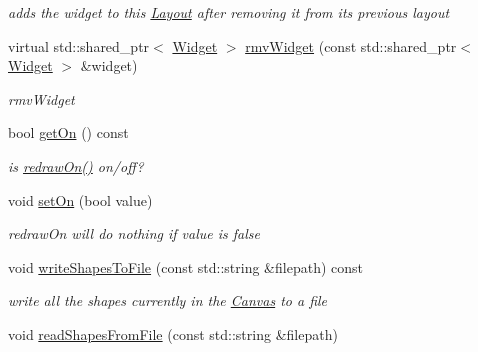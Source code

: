 \begin{DoxyCompactItemize}
\begin{DoxyCompactList}\small\item\em adds the widget to this \hyperlink{classcanvascv_1_1Layout}{Layout} after removing it from it\textquotesingle{}s previous layout \end{DoxyCompactList}\item 
virtual std\+::shared\+\_\+ptr$<$ \hyperlink{classcanvascv_1_1Widget}{Widget} $>$ \hyperlink{classcanvascv_1_1Canvas_a70248a9be2eedcacad74c9be5fd615eb}{rmv\+Widget} (const std\+::shared\+\_\+ptr$<$ \hyperlink{classcanvascv_1_1Widget}{Widget} $>$ \&widget)
\begin{DoxyCompactList}\small\item\em rmv\+Widget \end{DoxyCompactList}\item 
bool \hyperlink{classcanvascv_1_1Canvas_afe6a2955a5bbee8903350b4fba3f4473}{get\+On} () const \hypertarget{classcanvascv_1_1Canvas_afe6a2955a5bbee8903350b4fba3f4473}{}\label{classcanvascv_1_1Canvas_afe6a2955a5bbee8903350b4fba3f4473}

\begin{DoxyCompactList}\small\item\em is \hyperlink{classcanvascv_1_1Canvas_a018c66e277de7904b8146ea3f3feebdd}{redraw\+On()} on/off? \end{DoxyCompactList}\item 
void \hyperlink{classcanvascv_1_1Canvas_aba149ea25c6cdad2673133a060355954}{set\+On} (bool value)\hypertarget{classcanvascv_1_1Canvas_aba149ea25c6cdad2673133a060355954}{}\label{classcanvascv_1_1Canvas_aba149ea25c6cdad2673133a060355954}

\begin{DoxyCompactList}\small\item\em redraw\+On will do nothing if value is \textquotesingle{}false\textquotesingle{} \end{DoxyCompactList}\item 
void \hyperlink{classcanvascv_1_1Canvas_a494bb06b1a29232f05807f4a0e480ebb}{write\+Shapes\+To\+File} (const std\+::string \&filepath) const \hypertarget{classcanvascv_1_1Canvas_a494bb06b1a29232f05807f4a0e480ebb}{}\label{classcanvascv_1_1Canvas_a494bb06b1a29232f05807f4a0e480ebb}

\begin{DoxyCompactList}\small\item\em write all the shapes currently in the \hyperlink{classcanvascv_1_1Canvas}{Canvas} to a file \end{DoxyCompactList}\item 
void \hyperlink{classcanvascv_1_1Canvas_ab68000bb631c2fa7bb8863e746a8cff3}{read\+Shapes\+From\+File} (const std\+::string \&filepath)\hypertarget{classcanvascv_1_1Canvas_ab68000bb631c2fa7bb8863e746a8cff3}{}\label{classcanvascv_1_1Canvas_ab68000bb631c2fa7bb8863e746a8cff3}


\end{DoxyCompactItemize}
